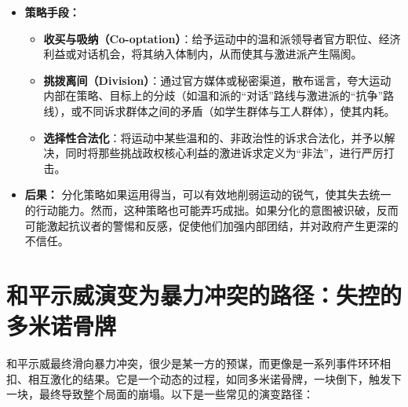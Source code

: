 \begin{itemize}
    \item \textbf{策略手段：}
    \begin{itemize}
        \item \textbf{收买与吸纳（Co-optation）}：给予运动中的温和派领导者官方职位、经济利益或对话机会，将其纳入体制内，从而使其与激进派产生隔阂。
        \item \textbf{挑拨离间（Division）}：通过官方媒体或秘密渠道，散布谣言，夸大运动内部在策略、目标上的分歧（如温和派的“对话”路线与激进派的“抗争”路线），或不同诉求群体之间的矛盾（如学生群体与工人群体），使其内耗。
        \item \textbf{选择性合法化}：将运动中某些温和的、非政治性的诉求合法化，并予以解决，同时将那些挑战政权核心利益的激进诉求定义为“非法”，进行严厉打击。
    \end{itemize}
    \item \textbf{后果：}
    分化策略如果运用得当，可以有效地削弱运动的锐气，使其失去统一的行动能力。然而，这种策略也可能弄巧成拙。如果分化的意图被识破，反而可能激起抗议者的警惕和反感，促使他们加强内部团结，并对政府产生更深的不信任。
\end{itemize}

\section{和平示威演变为暴力冲突的路径：失控的多米诺骨牌}

和平示威最终滑向暴力冲突，很少是某一方的预谋，而更像是一系列事件环环相扣、相互激化的结果。它是一个动态的过程，如同多米诺骨牌，一块倒下，触发下一块，最终导致整个局面的崩塌。以下是一些常见的演变路径：

